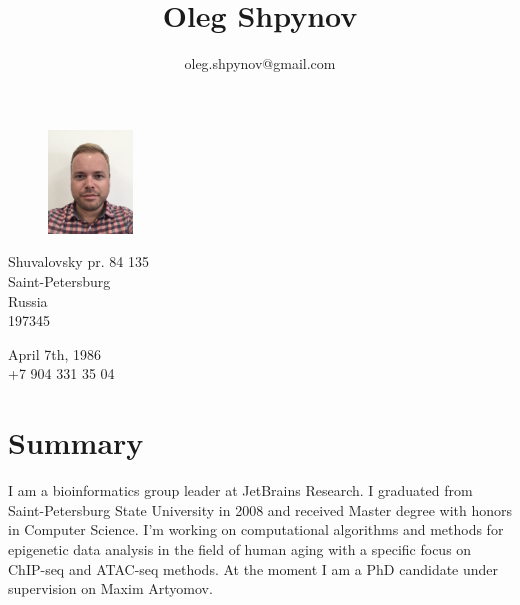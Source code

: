 \documentclass[11pt]{article}
\title{\bfseries\Huge Oleg Shpynov}
\author{oleg.shpynov@gmail.com}
\date{}
\begin{document}
\begin{figure}
    \vspace*{-4cm} %
	\hfill\includegraphics[width=0.20\textwidth]{me2020.png}
    \vspace*{-4cm} %
\end{figure}

\maketitle 

\begin{minipage}[ht]{0.4\textwidth}
Shuvalovsky pr. 84 135\\
Saint-Petersburg\\
Russia\\
197345
\end{minipage}
\begin{minipage}[ht]{0.3\textwidth}
April 7th, 1986\\
+7 904 331 35 04
\end{minipage}
\vspace{10pt}

\section*{Summary}
I am a bioinformatics group leader at JetBrains Research. I graduated from Saint-Petersburg State University in 2008 and received Master degree with honors in Computer Science. I'm working on computational algorithms and methods for epigenetic data analysis in the field of human aging with a specific focus on ChIP-seq and ATAC-seq methods. At the moment I am a PhD candidate under supervision on Maxim Artyomov.

\end{document}
